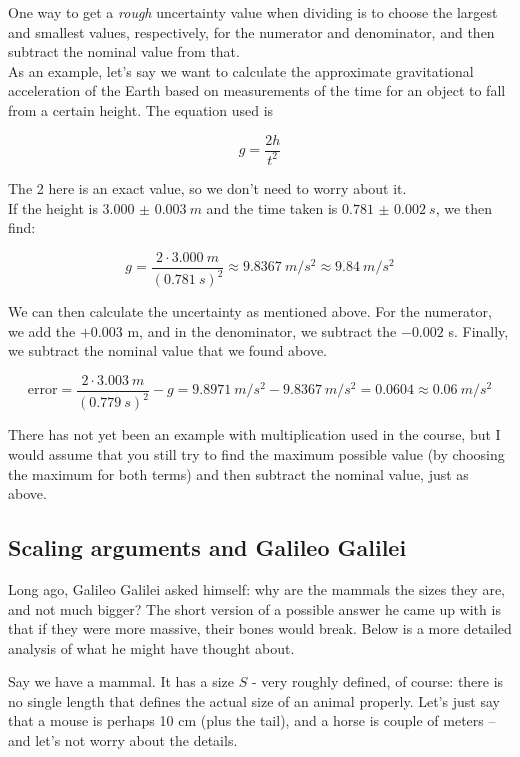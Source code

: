 One way to get a \emph{rough} uncertainty value when dividing is to choose the largest and smallest values, respectively, for the numerator and denominator, and then subtract the nominal value from that.\\
As an example, let's say we want to calculate the approximate gravitational acceleration of the Earth based on measurements of the time for an object to fall from a certain height. The equation used is

\begin{equation}
 g = \frac{2 h}{t^2}
\end{equation}

The 2 here is an exact value, so we don't need to worry about it.\\
If the height is $\SI{3.000(3)}{m}$ and the time taken is $\SI{0.781(2)}{s}$, we then find:


\begin{equation}
g = \frac{2\cdot\SI{3.000}{m}}{(\SI{0.781}{s})^2} \approx \SI{9.8367}{m/s^2} \approx \SI{9.84}{m/s^2}
\end{equation}

We can then calculate the uncertainty as mentioned above. For the numerator, we add the $+ 0.003$ m, and in the denominator, we subtract the $- 0.002$ s. Finally, we subtract the nominal value that we found above.

\begin{equation}
\text{error} = \frac{2 \cdot \SI{3.003}{m}}{(\SI{0.779}{s})^2} - g = \SI{9.8971}{m/s^2} - \SI{9.8367}{m/s^2} = 0.0604 \approx \SI{0.06}{m/s^2}
\end{equation}

There has not yet been an example with multiplication used in the course, but I would assume that you still try to find the maximum possible value (by choosing the maximum for both terms) and then subtract the nominal value, just as above.

\subsection{Scaling arguments and Galileo Galilei}

Long ago, Galileo Galilei asked himself: why are the mammals the sizes they are, and not much bigger? The short version of a possible answer he came up with is that if they were more massive, their bones would break. Below is a more detailed analysis of what he might have thought about.

Say we have a mammal. It has a size $S$ - very roughly defined, of course: there is no single length that defines the actual size of an animal properly. Let's just say that a mouse is perhaps 10 cm (plus the tail), and a horse is couple of meters -- and let's not worry about the details.

